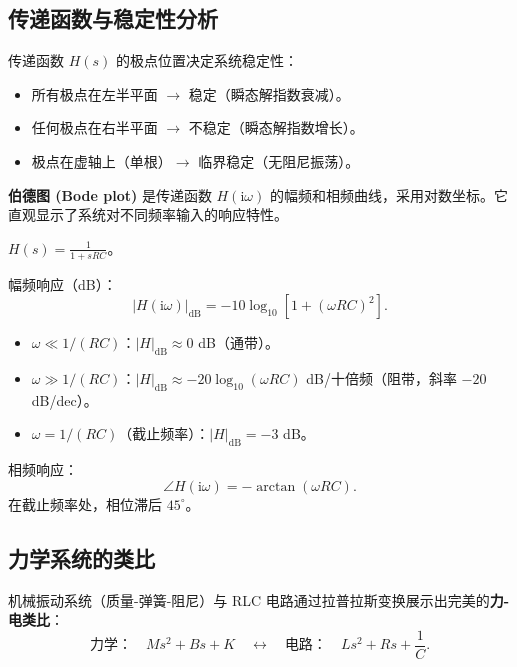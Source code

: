 \subsection{传递函数与稳定性分析}

传递函数 $H(s)$ 的极点位置决定系统稳定性：
\begin{itemize}
\item 所有极点在左半平面 $\to$ 稳定（瞬态解指数衰减）。
\item 任何极点在右半平面 $\to$ 不稳定（瞬态解指数增长）。
\item 极点在虚轴上（单根）$\to$ 临界稳定（无阻尼振荡）。
\end{itemize}

\textbf{伯德图 (Bode plot)} 是传递函数 $H(\mathrm{i}\omega)$ 的幅频和相频曲线，采用对数坐标。它直观显示了系统对不同频率输入的响应特性。

\begin{example}[一阶低通滤波器的伯德图]
$H(s) = \frac{1}{1 + sRC}$。

幅频响应（dB）：
\begin{equation}
|H(\mathrm{i}\omega)|_{\text{dB}} = -10\log_{10}\left[1 + (\omega RC)^2\right].
\end{equation}
\begin{itemize}
\item $\omega \ll 1/(RC)$：$|H|_{\text{dB}} \approx 0$ dB（通带）。
\item $\omega \gg 1/(RC)$：$|H|_{\text{dB}} \approx -20\log_{10}(\omega RC)$ dB/十倍频（阻带，斜率 $-20$ dB/dec）。
\item $\omega = 1/(RC)$（截止频率）：$|H|_{\text{dB}} = -3$ dB。
\end{itemize}

相频响应：
\begin{equation}
\angle H(\mathrm{i}\omega) = -\arctan(\omega RC).
\end{equation}
在截止频率处，相位滞后 $45^\circ$。
\end{example}

\subsection{力学系统的类比}

机械振动系统（质量-弹簧-阻尼）与 RLC 电路通过拉普拉斯变换展示出完美的\textbf{力-电类比}：
\begin{equation}
\text{力学：}\quad M s^2 + B s + K \quad\longleftrightarrow\quad
\text{电路：}\quad L s^2 + R s + \frac{1}{C}.
\end{equation}

